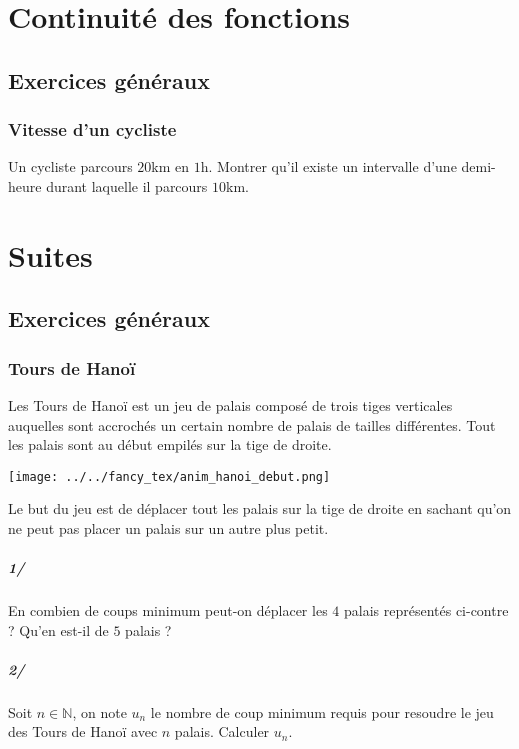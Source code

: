 \chapter{Continuité des fonctions}

    \section{Exercices généraux}

        \subsection{Vitesse d'un cycliste}

            Un cycliste parcours $20$km en $1$h. Montrer qu'il existe un intervalle d'une demi-heure durant laquelle il parcours $10$km.


\chapter{Suites}

    \section{Exercices généraux}

        \subsection{Tours de Hanoï}

            Les Tours de Hanoï est un jeu de palais composé de trois tiges verticales auquelles sont accrochés un certain nombre de palais 
            de tailles différentes. Tout les palais sont au début empilés sur la tige de droite.
            \begin{center}
                \texttt{[image: ../../fancy\_tex/anim\_hanoi\_debut.png]}
            \end{center}
            Le but du jeu est de déplacer tout les palais sur la tige de droite en sachant qu'on ne peut pas placer un palais sur un autre plus petit.

            \paragraph{1/} En combien de coups minimum peut-on déplacer les $4$ palais représentés ci-contre ? Qu'en est-il de $5$ palais ?

            \paragraph{2/} Soit $n\in\mathbb{N}$, on note $u_n$ le nombre de coup minimum requis pour resoudre le jeu des Tours de Hanoï avec $n$ palais. Calculer $u_n$.




